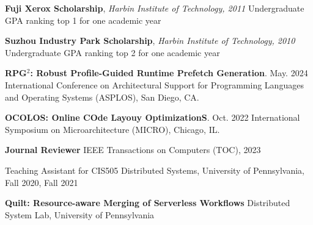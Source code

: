 \documentclass[10pt,a4paper]{article}
\begin{document}
\headedsection  %
  {{\textbf{Fuji Xerox Scholarship}, \textit{\small{Harbin Institute of Technology, 2011}}}}
  {\textsc{}} {%
  \headedsubsection
    {\normalfont Undergraduate GPA ranking top 1 for one academic year}
    {}
    {}
}

\headedsection  %
  {{\textbf{Suzhou Industry Park Scholarship}, \textit{\small{Harbin Institute of Technology, 2010}} }}
  {} {%
  \headedsubsection
    {\normalfont Undergraduate GPA ranking top 2 for one academic year}
    {}
    {}
}



\headedsection
  {\textbf{RPG$^2$: Robust Profile-Guided Runtime Prefetch Generation}. May. 2024}
  {\textsc{}} {%
  \inlineheadsection
    {}
    {International Conference on Architectural Support for Programming Languages and Operating Systems (ASPLOS), San Diego, CA.}{}
    \headedsubsection
    {}{}{}
}

\headedsection
  {\textbf{OCOLOS: Online COde Layouy OptimizationS}. Oct. 2022}
  {\textsc{}} {%
  \inlineheadsection
    {}
    {International Symposium on Microarchitecture (MICRO), Chicago, IL.}{}
    \headedsubsection
    {}{}{}
}



\headedsection
  {\textbf{Journal Reviewer}}
  {\textsc{}} {%
  \inlineheadsection
    {}
    {IEEE Transactions on Computers (TOC), 2023}{}
  \headedsubsection
    {}{}{}
}





\inlineheadsection
  {Teaching Assistant for CIS505 Distributed Systems,}
  {University of Pennsylvania, Fall 2020, Fall 2021}



\headedsection  %
  {{\textbf{Quilt: Resource-aware Merging of Serverless Workflows}}}
  {\textsc{}} {%
  \headedsubsection
    {Distributed System Lab, University of Pennsylvania}
    {}
    {}
}
\end{document}
